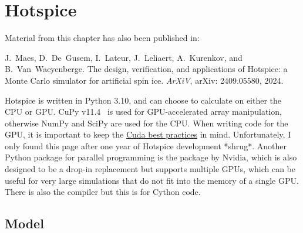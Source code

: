 \chapter{Hotspice}\label{ch:Hotspice}

Material from this chapter has also been published in: \\
\begin{adjustwidth}{2em}{2em} %
    J.~Maes, D.~De~Gusem, I.~Lateur, J.~Leliaert, A.~Kurenkov, and B.~Van~Waeyenberge.
    \newblock The design, verification, and applications of Hotspice: a Monte Carlo simulator for artificial spin ice.
    \newblock \emph{ArXiV}, arXiv: 2409.05580, 2024.
\end{adjustwidth}

Hotspice is written in Python 3.10, and can choose to calculate on either the CPU or GPU.
CuPy v11.4~\cite{CuPy} is used for GPU-accelerated array manipulation, otherwise NumPy and SciPy are used for the CPU.
When writing code for the GPU, it is important to keep the \href{https://docs.nvidia.com/cuda/cuda-c-best-practices-guide/index.html}{Cuda best practices} in mind.
Unfortunately, I only found this page after one year of Hotspice development *shrug*.
Another Python package for parallel programming is the  package by Nvidia, which is also designed to be a drop-in  replacement but supports multiple GPUs, which can be useful for very large simulations that do not fit into the memory of a single GPU.
There is also the  compiler but this is for Cython code. \par

\section{Model}

\cite{Hotspice}

\\

